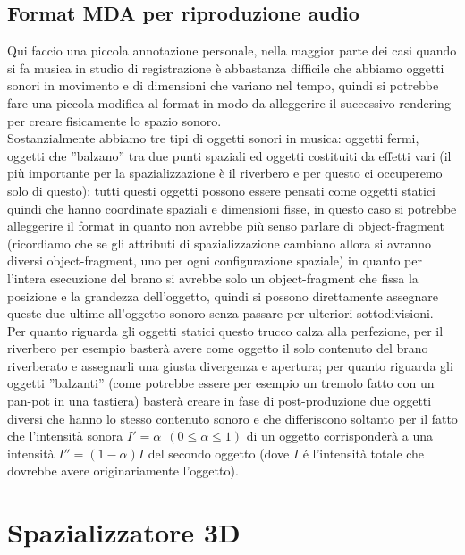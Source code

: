 \documentclass[12pt,a4paper]{report}
\begin{document}
\subsection{Format MDA per riproduzione audio}

Qui faccio una piccola annotazione personale, nella maggior parte dei casi quando si fa musica in studio di registrazione è abbastanza difficile che abbiamo oggetti sonori in movimento e di dimensioni che variano nel tempo, quindi si potrebbe fare una piccola modifica al format in modo da alleggerire il successivo rendering per creare fisicamente lo spazio sonoro.\\

Sostanzialmente abbiamo tre tipi di oggetti sonori in musica: oggetti fermi, oggetti che ''balzano'' tra due punti spaziali ed oggetti costituiti da effetti vari (il più importante per la spazializzazione è il riverbero e per questo ci occuperemo solo di questo); tutti questi oggetti possono essere pensati come oggetti statici quindi che hanno coordinate spaziali e dimensioni fisse, in questo caso si potrebbe alleggerire il format in quanto non avrebbe più senso parlare di object-fragment (ricordiamo che se gli attributi di spazializzazione cambiano allora si avranno diversi object-fragment, uno per ogni configurazione spaziale) in quanto per l'intera esecuzione del brano si avrebbe solo un object-fragment che fissa la posizione e la grandezza dell'oggetto, quindi si possono direttamente assegnare queste due ultime all'oggetto sonoro senza passare per ulteriori sottodivisioni.\\

Per quanto riguarda gli oggetti statici questo trucco calza alla perfezione, per il riverbero per esempio basterà avere come oggetto il solo contenuto del brano riverberato e assegnarli una giusta divergenza e apertura; per quanto riguarda gli oggetti ''balzanti'' (come potrebbe essere per esempio un tremolo fatto con un pan-pot in una tastiera) basterà creare in fase di post-produzione due oggetti diversi che hanno lo stesso contenuto sonoro e che differiscono soltanto per il fatto che l'intensità sonora $I'=\alpha \ \ (0\leq \alpha \leq 1)$ di un oggetto corrisponderà a una intensità $I''=(1-\alpha) I$ del secondo oggetto (dove $I$ é l'intensità totale che dovrebbe avere originariamente l'oggetto).

\section{Spazializzatore 3D}
\end{document}
